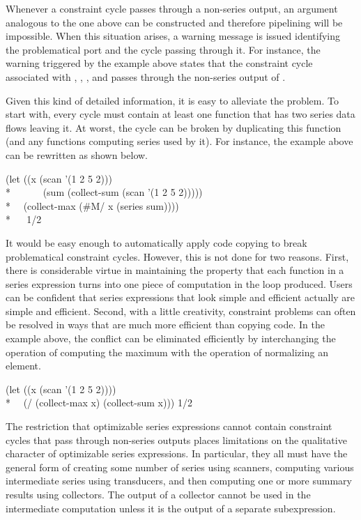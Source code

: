 Whenever a constraint cycle passes through a non-series output, an argument
analogous to the one above can be constructed and therefore pipelining will be
impossible.  When this situation arises, a warning message is issued
identifying the problematical port and the cycle passing through it.  For
instance, the warning triggered by the example above states that the
constraint cycle associated with , , 
, and  passes through the non-series output of 
.

Given this kind of detailed information, it is easy to alleviate the
problem.  To start with, every cycle must contain at least one function
that has two series data flows leaving it.  At worst, the cycle can be broken by
duplicating this function (and any functions computing series used by it).
For instance, the example above can be
rewritten as shown below.
\begin{lisp}
(let ((x (scan '(1 2 5 2))) \\*
~~~~~~(sum (collect-sum (scan '(1 2 5 2))))) \\*
~~(collect-max (\#M/ x (series sum)))) \\*
~~{\EV} 1/2
\end{lisp}

It would be easy enough to automatically apply code copying to break
problematical constraint cycles.  However, this is not done for two
reasons.  First, there is considerable virtue in maintaining the property
that each function in a series expression turns into one piece of
computation in the loop produced.  Users can be confident that series
expressions that look simple and efficient actually are simple and
efficient.  Second, with a little creativity, constraint problems can often
be resolved in ways that are much more efficient than copying code.  In the
example above, the conflict can be eliminated efficiently by interchanging
the operation of computing the maximum with the operation of normalizing an
element.
\begin{lisp}
(let ((x (scan '(1 2 5 2)))) \\*
~~(/ (collect-max x) (collect-sum x))) {\EV} 1/2
\end{lisp}

The restriction that optimizable series expressions cannot contain
constraint cycles that pass through non-series outputs places limitations on
the qualitative character of optimizable series expressions.  In particular,
they all must have the general form of creating some number of series using
scanners, computing various intermediate series using transducers, and then
computing one or more summary results using collectors.  The output of a
collector cannot be used in the intermediate computation unless it is the
output of a separate subexpression.

